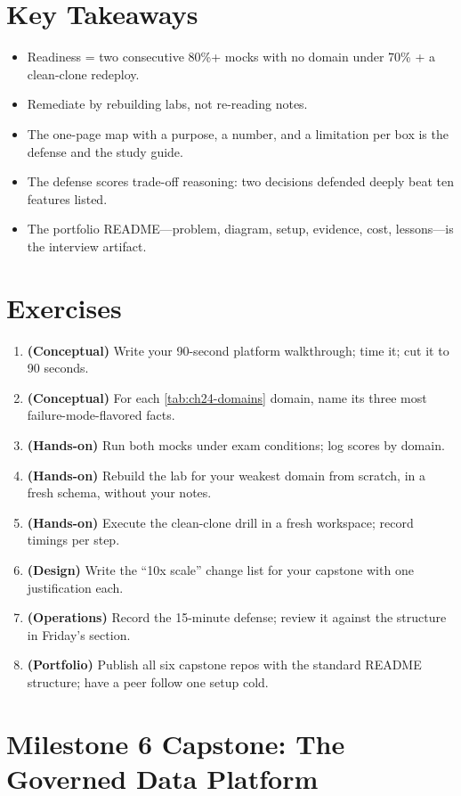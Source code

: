 \section*{Key Takeaways}
\begin{itemize}
    \item Readiness = two consecutive 80\%+ mocks with no domain under 70\% + a clean-clone redeploy.
    \item Remediate by rebuilding labs, not re-reading notes.
    \item The one-page map with a purpose, a number, and a limitation per box is the defense and the study guide.
    \item The defense scores trade-off reasoning: two decisions defended deeply beat ten features listed.
    \item The portfolio README---problem, diagram, setup, evidence, cost, lessons---is the interview artifact.
\end{itemize}

\section{Exercises}
\begin{enumerate}
    \item \textbf{(Conceptual)} Write your 90-second platform walkthrough; time it; cut it to 90 seconds.
    \item \textbf{(Conceptual)} For each \cref{tab:ch24-domains} domain, name its three most failure-mode-flavored facts.
    \item \textbf{(Hands-on)} Run both mocks under exam conditions; log scores by domain.
    \item \textbf{(Hands-on)} Rebuild the lab for your weakest domain from scratch, in a fresh schema, without your notes.
    \item \textbf{(Hands-on)} Execute the clean-clone drill in a fresh workspace; record timings per step.
    \item \textbf{(Design)} Write the ``10x scale'' change list for your capstone with one justification each.
    \item \textbf{(Operations)} Record the 15-minute defense; review it against the structure in Friday's section.
    \item \textbf{(Portfolio)} Publish all six capstone repos with the standard README structure; have a peer follow one setup cold.
\end{enumerate}

\section{Milestone 6 Capstone: The Governed Data Platform}\label{sec:ch24-capstone}

